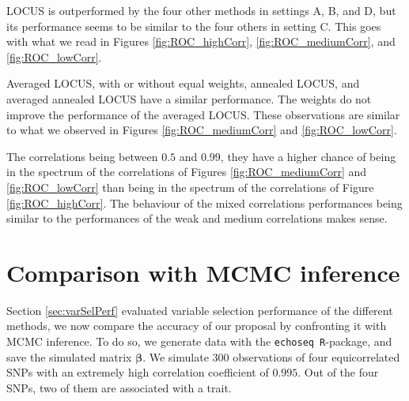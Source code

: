 \documentclass[a4paper, 11pt]{report}
\numberwithin{equation}{chapter}
\begin{document}
LOCUS is outperformed by the four other methods in settings A, B, and D, but its performance seems to be similar to the four others in setting C. This goes with what we read in Figures \ref{fig:ROC_highCorr}, \ref{fig:ROC_mediumCorr}, and \ref{fig:ROC_lowCorr}.

Averaged LOCUS, with or without equal weights, annealed LOCUS, and averaged annealed LOCUS have a similar performance. The weights do not improve the performance of the averaged LOCUS. These observations are similar to what we observed in Figures \ref{fig:ROC_mediumCorr} and  \ref{fig:ROC_lowCorr}. 

The correlations being between $0.5$ and $0.99$, they have a higher chance of being in the spectrum of the correlations of Figures \ref{fig:ROC_mediumCorr} and \ref{fig:ROC_lowCorr} than being in the spectrum of the correlations of Figure \ref{fig:ROC_highCorr}. The behaviour of the mixed correlations performances being similar to the performances of the weak and medium correlations makes sense. 


\section{Comparison with MCMC inference} \label{sec:comparison}
Section \ref{sec:varSelPerf} evaluated variable selection performance of the different methods, we now compare the accuracy of our proposal by confronting it with MCMC inference. To do so, we generate data with the \texttt{echoseq R}-package, and save the simulated matrix $\boldsymbol{\beta}$. We simulate $300$ observations of four equicorrelated SNPs with an extremely high correlation coefficient of $0.995$. Out of the four SNPs, two of them are associated with a trait.
\end{document}
